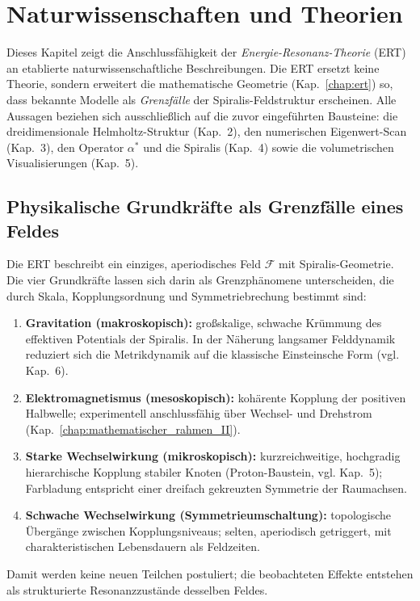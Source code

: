 \chapter{Naturwissenschaften und Theorien}
\label{chap:naturwissenschaften}

Dieses Kapitel zeigt die Anschlussfähigkeit der \emph{Energie-Resonanz-Theorie} (\acrshort{ERT}) an etablierte naturwissenschaftliche Beschreibungen. 
Die \acrshort{ERT} ersetzt keine Theorie, sondern erweitert die mathematische Geometrie (Kap.~\ref{chap:ert}) so, dass bekannte Modelle als \emph{Grenzfälle} der Spiralis-Feldstruktur erscheinen. 
Alle Aussagen beziehen sich ausschließlich auf die zuvor eingeführten Bausteine: die dreidimensionale Helmholtz-Struktur (Kap.~2), den numerischen Eigenwert-Scan (Kap.~3), den Operator \(\alpha^*\) und die Spiralis (Kap.~4) sowie die volumetrischen Visualisierungen (Kap.~5).

\section{Physikalische Grundkräfte als Grenzfälle eines Feldes}
\label{sec:grundkraefte}
Die \acrshort{ERT} beschreibt ein einziges, aperiodisches Feld \(\mathcal{F}\) mit Spiralis-Geometrie. 
Die vier Grundkräfte lassen sich darin als Grenzphänomene unterscheiden, die durch Skala, Kopplungsordnung und Symmetriebrechung bestimmt sind:
\begin{enumerate}
  \item \textbf{Gravitation (makroskopisch):} großskalige, schwache Krümmung des effektiven Potentials der Spiralis. 
        In der Näherung langsamer Felddynamik reduziert sich die Metrikdynamik auf die klassische Einsteinsche Form (vgl. Kap.~6).
  \item \textbf{Elektromagnetismus (mesoskopisch):} kohärente Kopplung der positiven Halbwelle; experimentell anschlussfähig über Wechsel- und Drehstrom (Kap.~\ref{chap:mathematischer_rahmen_II}).
  \item \textbf{Starke Wechselwirkung (mikroskopisch):} kurzreichweitige, hochgradig hierarchische Kopplung stabiler Knoten (Proton-Baustein, vgl. Kap.~5); Farbladung entspricht einer dreifach gekreuzten Symmetrie der Raumachsen.
  \item \textbf{Schwache Wechselwirkung (Symmetrieumschaltung):} topologische Übergänge zwischen Kopplungsniveaus; selten, aperiodisch getriggert, mit charakteristischen Lebensdauern als Feldzeiten.
\end{enumerate}
Damit werden keine neuen Teilchen postuliert; die beobachteten Effekte entstehen als strukturierte Resonanzzustände desselben Feldes.

